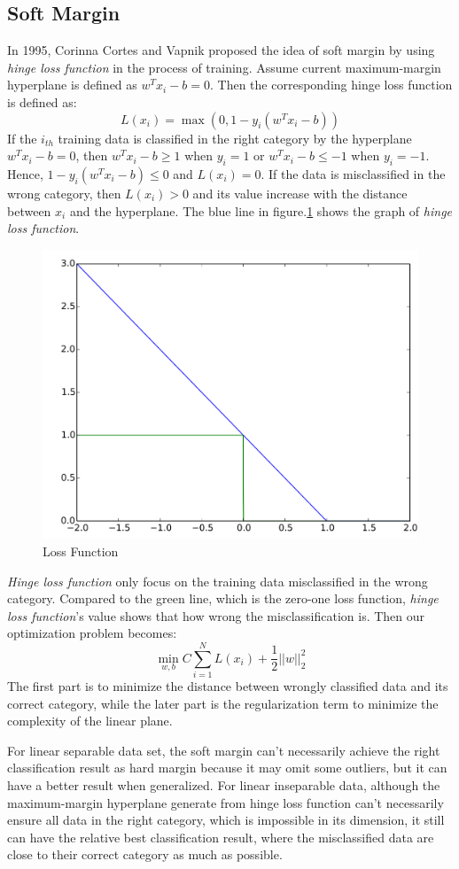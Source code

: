 \documentclass{article}
\begin{document}
\subsection{Soft Margin}In 1995, Corinna Cortes and Vapnik proposed the idea of soft margin by using \emph{hinge loss function} in the process of training. Assume current maximum-margin hyperplane is defined as $w^Tx_i-b=0$. Then the corresponding hinge loss function is defined as:
$$L(x_i)=\max(0,1-y_i(w^Tx_i-b))$$
If the $i_{th}$ training data is classified in the right category by the hyperplane $w^Tx_i-b=0$, then $w^Tx_i-b\geq1$ when $y_i=1$ or $w^Tx_i-b\leq-1$ when $y_i=-1$. Hence, $1-y_i(w^Tx_i-b)\leq0$ and $L(x_i)=0$. If the data is misclassified in the wrong category, then $L(x_i)>0$ and its value increase with the distance between $x_i$ and the hyperplane. The blue line in figure.\ref{hl} shows the graph of \emph{hinge loss function}.
\begin{figure}[H]
    \centering
    \includegraphics[scale=0.2]{P2.jpg}
    \caption{Loss Function}
    \label{hl}
\end{figure}
\emph{Hinge loss function} only focus on the training data misclassified in the wrong category. Compared to the green line, which is the zero-one loss function, \emph{hinge loss function}'s value shows that how wrong the misclassification is. Then our optimization problem becomes:
$$\min_{w,b} C\sum_{i=1}^NL(x_i)+\frac{1}{2}||w||_2^2$$
The first part is to minimize the distance between wrongly classified data and its correct category, while the later part is the regularization term to minimize the complexity of the linear plane. 
\par For linear separable data set, the soft margin can't necessarily achieve the right classification result as hard margin because it may omit some outliers, but it can have a better result when generalized. For linear inseparable data, although the maximum-margin hyperplane generate from hinge loss function can't necessarily ensure all data in the right category, which is impossible in its dimension, it still can have the relative best classification result, where the misclassified data are close to their correct category as much as possible.
\end{document}

